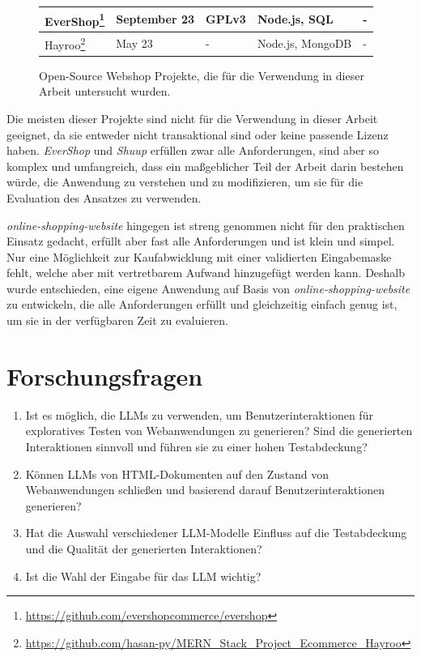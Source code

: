 \begin{figure}[h]
\begin{minipage}[c]{\textwidth}
{\begin{tabular}{ | l | l | l | l | l |}
                EverShop\footnote{\url{https://github.com/evershopcommerce/evershop}} & September 23 & GPLv3 & Node.js, SQL & - \\ \hline
                Hayroo\footnote{\url{https://github.com/hasan-py/MERN_Stack_Project_Ecommerce_Hayroo}} & May 23 & - & Node.js, MongoDB & - \\ \hline
            \end{tabular}
        }
    \end{minipage}
    \caption{Open-Source Webshop Projekte, die für die Verwendung in dieser Arbeit untersucht wurden.}
    \label{tab:webshop_projects}
\end{figure}

Die meisten dieser Projekte sind nicht für die Verwendung in dieser Arbeit geeignet, da sie entweder nicht transaktional sind oder keine passende Lizenz haben.
\textit{EverShop} und \textit{Shuup} erfüllen zwar alle Anforderungen, sind aber so komplex und umfangreich, dass ein maßgeblicher Teil der Arbeit darin bestehen würde, die Anwendung zu verstehen und zu modifizieren, um sie für die Evaluation des Ansatzes zu verwenden.

\textit{online-shopping-website} hingegen ist streng genommen nicht für den praktischen Einsatz gedacht, erfüllt aber fast alle Anforderungen und ist klein und simpel.
Nur eine Möglichkeit zur Kaufabwicklung mit einer validierten Eingabemaske fehlt, welche aber mit vertretbarem Aufwand hinzugefügt werden kann.
Deshalb wurde entschieden, eine eigene Anwendung auf Basis von \textit{online-shopping-website} zu entwickeln, die alle Anforderungen erfüllt und gleichzeitig einfach genug ist, um sie in der verfügbaren Zeit zu evaluieren.

\section{Forschungsfragen}

\begin{enumerate}
    \item Ist es möglich, die LLMs zu verwenden, um Benutzerinteraktionen für exploratives Testen von Webanwendungen zu generieren? Sind die generierten Interaktionen sinnvoll und führen sie zu einer hohen Testabdeckung?
    \item Können LLMs von HTML-Dokumenten auf den Zustand von Webanwendungen schließen und basierend darauf Benutzerinteraktionen generieren?
    \item Hat die Auswahl verschiedener LLM-Modelle Einfluss auf die Testabdeckung und die Qualität der generierten Interaktionen?
    \item Ist die Wahl der Eingabe für das LLM wichtig?
\end{enumerate}

